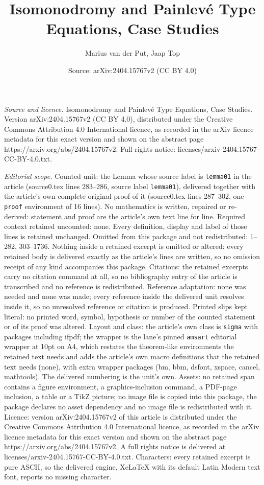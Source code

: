 \documentclass[10pt,a4paper]{amsart}
\title[Isomonodromy and Painlev\'e Type Equations, Case Studies]{Isomonodromy and Painlev\'e Type Equations, Case Studies}
\author{Marius van der Put, Jaap Top}
\date{Source: arXiv:2404.15767v2 (CC BY 4.0)}
\begin{document}
\maketitle

\noindent\emph{Source and licence.} Isomonodromy and Painlev\'e Type Equations, Case Studies. Version arXiv:2404.15767v2 (CC BY 4.0), distributed under the Creative Commons Attribution 4.0 International licence, as recorded in the arXiv licence metadata for this exact version and shown on the abstract page https://arxiv.org/abs/2404.15767v2. Full rights notice: licenses/arxiv-2404.15767-CC-BY-4.0.txt.\par\smallskip

\noindent\textit{Editorial scope.} Counted unit: the Lemma whose source label is \texttt{lemma01} in the article (source0.tex lines 283--286, source label \texttt{lemma01}), delivered together with the article's own complete original proof of it (source0.tex lines 287--302, one \texttt{proof} environment of 16 lines). No mathematics is written, repaired or re-derived: statement and proof are the article's own text line for line. Required context retained uncounted: none. Every definition, display and label of those lines is retained unchanged. Omitted from this package and not redistributed: 1--282, 303--1736. Nothing inside a retained excerpt is omitted or altered: every retained body is delivered exactly as the article's lines are written, so no omission receipt of any kind accompanies this package. Citations: the retained excerpts carry no citation command at all, so no bibliography entry of the article is transcribed and no reference is redistributed. Reference adaptation: none was needed and none was made; every reference inside the delivered unit resolves inside it, so no unresolved reference or citation is produced. Printed slips kept literal: no printed word, symbol, hypothesis or number of the counted statement or of its proof was altered. Layout and class: the article's own class is \texttt{sigma} with packages including ifpdf; the wrapper is the lane's pinned \texttt{amsart} editorial wrapper at 10pt on A4, which restates the theorem-like environments the retained text needs and adds the article's own macro definitions that the retained text needs (none), with extra wrapper packages (bm, bbm, dsfont, xspace, cancel, mathtools). The delivered numbering is the unit's own. Assets: no retained span contains a figure environment, a graphics-inclusion command, a PDF-page inclusion, a table or a TikZ picture; no image file is copied into this package, the package declares no asset dependency and no image file is redistributed with it. Licence: version arXiv:2404.15767v2 of this article is distributed under the Creative Commons Attribution 4.0 International licence, as recorded in the arXiv licence metadata for this exact version and shown on the abstract page https://arxiv.org/abs/2404.15767v2. A full rights notice is delivered at licenses/arxiv-2404.15767-CC-BY-4.0.txt. Characters: every retained excerpt is pure ASCII, so the delivered engine, XeLaTeX with its default Latin Modern text font, reports no missing character.
\end{document}
